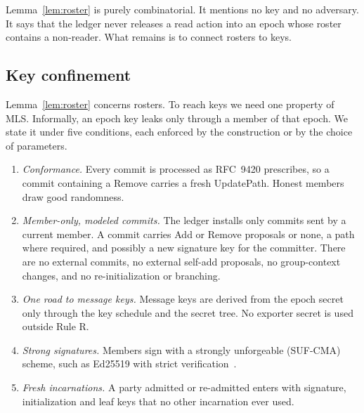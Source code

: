 \documentclass[aps,prx,reprint,superscriptaddress,nofootinbib,floatfix]{revtex4-2}
\theoremstyle{remark}
\begin{document}
Lemma~\ref{lem:roster} is purely combinatorial. It mentions no key and no adversary. It says that the ledger never releases a read action into an epoch whose roster contains a non-reader. What remains is to connect rosters to keys.

\subsection{Key confinement}\label{sec:K}

Lemma~\ref{lem:roster} concerns rosters. To reach keys we need one property of MLS. Informally, an epoch key leaks only through a member of that epoch. We state it under five conditions, each enforced by the construction or by the choice of parameters.
\begin{enumerate}
\item[K1.] \emph{Conformance.} Every commit is processed as RFC~9420 prescribes, so a commit containing a Remove carries a fresh UpdatePath. Honest members draw good randomness.
\item[K2.] \emph{Member-only, modeled commits.} The ledger installs only commits sent by a current member. A commit carries Add or Remove proposals or none, a path where required, and possibly a new signature key for the committer. There are no external commits, no external self-add proposals, no group-context changes, and no re-initialization or branching.
\item[K3.] \emph{One road to message keys.} Message keys are derived from the epoch secret only through the key schedule and the secret tree. No exporter secret is used outside Rule R.
\item[K4.] \emph{Strong signatures.} Members sign with a strongly unforgeable (SUF-CMA) scheme, such as Ed25519 with strict verification~\cite{ed25519-provable}.
\item[K5.] \emph{Fresh incarnations.} A party admitted or re-admitted enters with signature, initialization and leaf keys that no other incarnation ever used.
\end{enumerate}
\end{document}
